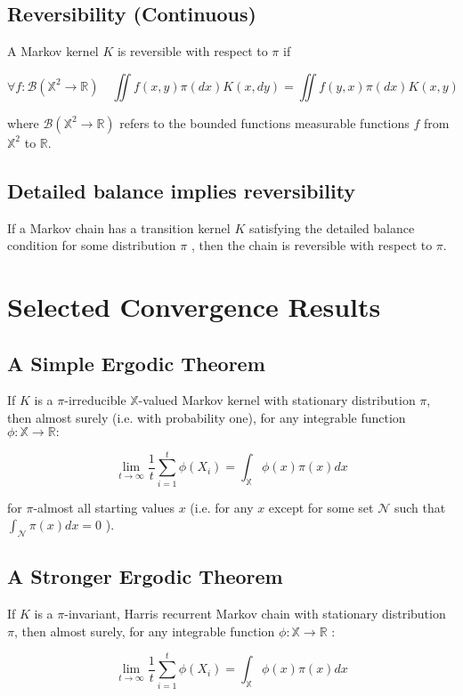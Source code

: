 \documentclass[10pt]{article}
\begin{document}
\subsection{Reversibility (Continuous)}
A Markov kernel $K$ is reversible with respect to $\pi$ if

$$
\forall f: \mathcal{B}\left(\mathbb{X}^{2} \rightarrow \mathbb{R}\right) \quad \iint f(x, y) \pi(d x) K(x, d y)=\iint f(y, x) \pi(d x) K(x, y)
$$

where $\mathcal{B}\left(\mathbb{X}^{2} \rightarrow \mathbb{R}\right)$ refers to the bounded functions measurable functions $f$ from $\mathbb{X}^{2}$ to $\mathbb{R}$.


\subsection{Detailed balance implies reversibility}
If a Markov chain has a transition kernel $K$ satisfying the detailed balance condition for some distribution $\pi$ , then the chain is reversible with respect to $\pi$.

\section{Selected Convergence Results}
\subsection{A Simple Ergodic Theorem}
If $K$ is a $\pi$-irreducible $\mathbb{X}$-valued Markov kernel with stationary distribution $\pi$, then almost surely (i.e. with probability one), for any integrable function $\phi: \mathbb{X} \rightarrow \mathbb{R}:$

$$
\lim _{t \rightarrow \infty} \frac{1}{t} \sum_{i=1}^{t} \phi\left(X_{i}\right)=\int_{\mathbb{X}} \phi(x) \pi(x) d x
$$

for $\pi$-almost all starting values $x$ (i.e. for any $x$ except for some set $\mathcal{N}$ such that $\int_{\mathcal{N}} \pi(x) d x=0$ ).

\subsection{A Stronger Ergodic Theorem}
If $K$ is a $\pi$-invariant, Harris recurrent Markov chain with stationary distribution $\pi$, then almost surely, for any integrable function $\phi: \mathbb{X} \rightarrow \mathbb{R}$ :

$$
\lim _{t \rightarrow \infty} \frac{1}{t} \sum_{i=1}^{t} \phi\left(X_{i}\right)=\int_{\mathbb{X}} \phi(x) \pi(x) d x
$$
\end{document}
